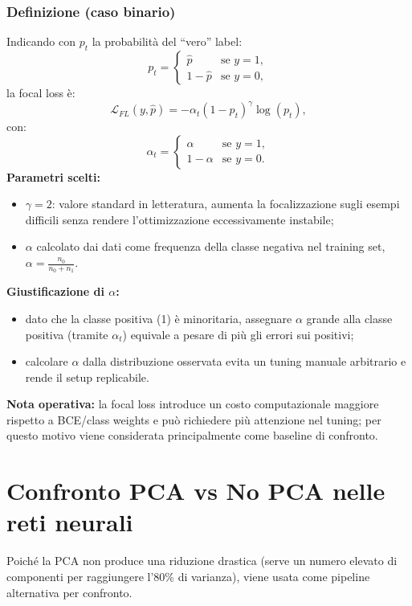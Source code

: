 \subsubsection{Definizione (caso binario)}
Indicando con $p_t$ la probabilità del ``vero'' label:
\begin{equation}
 p_t = \begin{cases}
 \hat{p} & \text{se } y=1,\\
 1-\hat{p} & \text{se } y=0,
 \end{cases}
\end{equation}
la focal loss è:
\begin{equation}
\mathcal{L}_{FL}(y,\hat{p}) = -\alpha_t (1-p_t)^\gamma \log(p_t),
\end{equation}
con:
\begin{equation}
\alpha_t = \begin{cases}
 \alpha & \text{se } y=1,\\
 1-\alpha & \text{se } y=0.
 \end{cases}
\end{equation}
\textbf{Parametri scelti:}
\begin{itemize}
  \item $\gamma=2$: valore standard in letteratura, aumenta la focalizzazione sugli esempi difficili senza rendere l'ottimizzazione eccessivamente instabile;
  \item $\alpha$ calcolato dai dati come frequenza della classe negativa nel training set, $\alpha = \frac{n_0}{n_0+n_1}$.
\end{itemize}
\textbf{Giustificazione di $\alpha$:}
\begin{itemize}
  \item dato che la classe positiva (1) è minoritaria, assegnare $\alpha$ grande alla classe positiva (tramite $\alpha_t$) equivale a pesare di più gli errori sui positivi;
  \item calcolare $\alpha$ dalla distribuzione osservata evita un tuning manuale arbitrario e rende il setup replicabile.
\end{itemize}
\textbf{Nota operativa:} la focal loss introduce un costo computazionale maggiore rispetto a BCE/class weights e può richiedere più attenzione nel tuning; per questo motivo viene considerata principalmente come baseline di confronto.

\section{Confronto PCA vs No PCA nelle reti neurali}
Poiché la PCA non produce una riduzione drastica (serve un numero elevato di componenti per raggiungere l'80\% di varianza), viene usata come pipeline alternativa per confronto.

